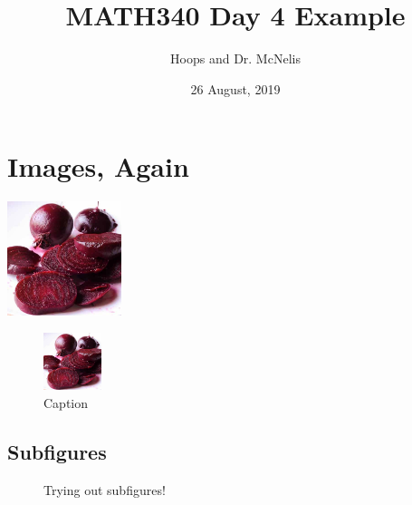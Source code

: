 \documentclass{article}
\title{MATH340 Day 4 Example}
\author{Hoops and Dr. McNelis}
\date{26 August, 2019}
\begin{document}
\maketitle

\section{Images, Again}

\includegraphics[width=0.25\textwidth]{beets.jpeg} 

\begin{figure}[h]
    \centering %
    \includegraphics[width=0.15\textwidth]{beets.jpeg} %
    \caption{Caption} %
    \label{fig:my_label}
\end{figure}


\newpage
\subsection{Subfigures}

\begin{figure}[h!]
    \caption{Trying out subfigures!}
\end{figure}
\end{document}
